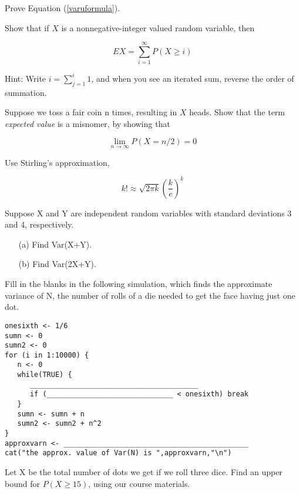 \oneproblem
Prove Equation (\ref{varuformula}).

\oneproblem
Show that if $X$ is a nonnegative-integer valued random variable, then

\begin{equation}
EX = \sum_{i=1}^{\infty} P(X \geq i)
\end{equation}

Hint:  Write $i = \sum_{j=1}^i 1$, and when you see an iterated sum,
reverse the order of summation.

\oneproblem
Suppose we toss a fair coin n times, resulting in $X$ heads.  Show that
the term {\it expected value} is a misnomer, by showing that

\begin{equation}
\lim_{n \rightarrow \infty} P(X = n/2) = 0
\end{equation}

Use Stirling's approximation, 

\begin{equation}
k! \approx \sqrt{2 \pi k} \left ( \frac{k}{e} \right )^k
\end{equation}

\oneproblem
Suppose X and Y are independent random variables with standard
deviations 3 and 4, respectively.

\begin{itemize}

\item [(a)] Find Var(X+Y).

\item [(b)] Find Var(2X+Y).

\end{itemize}

\oneproblem
Fill in the blanks in the following simulation, which finds
the approximate variance of N, the number of rolls of a die needed to
get the face having just one dot.

\begin{Verbatim}[fontsize=\relsize{-2}]
onesixth <- 1/6
sumn <- 0
sumn2 <- 0
for (i in 1:10000) {
   n <- 0
   while(TRUE) {
      ________________________________________
      if (______________________________ < onesixth) break
   }
   sumn <- sumn + n
   sumn2 <- sumn2 + n^2
}
approxvarn <- ____________________________________________
cat("the approx. value of Var(N) is ",approxvarn,"\n")
\end{Verbatim}

\oneproblem
Let X be the total number of dots we get if we roll three
dice.  Find an upper bound for $P(X \geq 15)$, using our course
materials.


